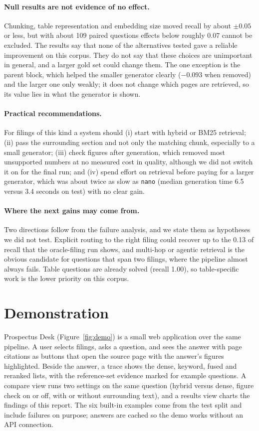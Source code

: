 \documentclass[11pt,a4paper]{article}
\begin{document}
\paragraph{Null results are not evidence of no effect.}
Chunking, table representation and embedding size moved recall by about $\pm0.05$ or less, but with about 109 paired questions effects below roughly 0.07 cannot be excluded. The results say that none of the alternatives tested gave a reliable improvement on this corpus. They do not say that these choices are unimportant in general, and a larger gold set could change them. The one exception is the parent block, which helped the smaller generator clearly ($-0.093$ when removed) and the larger one only weakly; it does not change which pages are retrieved, so its value lies in what the generator is shown.

\paragraph{Practical recommendations.}
For filings of this kind a system should (i) start with hybrid or BM25 retrieval; (ii) pass the surrounding section and not only the matching chunk, especially to a small generator; (iii) check figures after generation, which removed most unsupported numbers at no measured cost in quality, although we did not switch it on for the final run; and (iv) spend effort on retrieval before paying for a larger generator, which was about twice as slow as \texttt{nano} (median generation time 6.5 versus 3.4 seconds on test) with no clear gain.

\paragraph{Where the next gains may come from.}
Two directions follow from the failure analysis, and we state them as hypotheses we did not test. Explicit routing to the right filing could recover up to the 0.13 of recall that the oracle-filing run shows, and multi-hop or agentic retrieval is the obvious candidate for questions that span two filings, where the pipeline almost always fails. Table questions are already solved (recall 1.00), so table-specific work is the lower priority on this corpus.

\section{Demonstration}
Prospectus Desk (Figure~\ref{fig:demo}) is a small web application over the same pipeline. A user selects filings, asks a question, and sees the answer with page citations as buttons that open the source page with the answer's figures highlighted. Beside the answer, a trace shows the dense, keyword, fused and reranked lists, with the reference-set evidence marked for example questions. A compare view runs two settings on the same question (hybrid versus dense, figure check on or off, with or without surrounding text), and a results view charts the findings of this report. The six built-in examples come from the test split and include failures on purpose; answers are cached so the demo works without an API connection.
\end{document}
